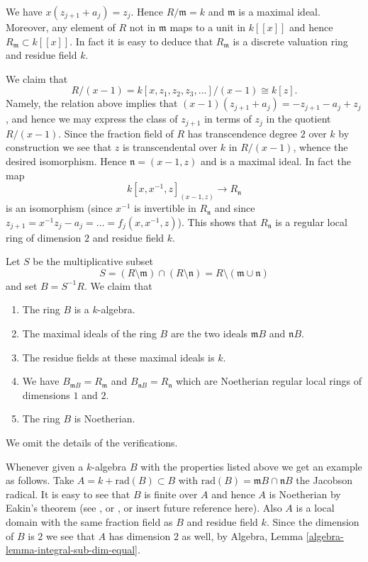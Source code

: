 \medskip\noindent
We have $x(z_{j + 1} + a_j) = z_j$. Hence $R/\mathfrak m = k$
and $\mathfrak m$ is a maximal ideal. Moreover, any element of $R$
not in $\mathfrak m$ maps to a unit in $k[[x]]$ and hence
$R_{\mathfrak m} \subset k[[x]]$. In fact it is easy to deduce
that $R_{\mathfrak m}$ is a discrete valuation ring and residue
field $k$.

\medskip\noindent
We claim that
$$
R/(x - 1) =
k[x, z_1, z_2, z_3, \ldots ]/(x - 1)
\cong
k[z].
$$
Namely, the relation above implies that
$(x - 1)(z_{j + 1} + a_j) = -z_{j + 1} - a_j + z_j$, and hence
we may express the class of $z_{j + 1}$ in terms of $z_j$ in
the quotient $R/(x - 1)$. Since the fraction field of $R$
has transcendence degree $2$ over $k$ by construction we see that $z$ is
transcendental over $k$ in $R/(x - 1)$, whence the desired isomorphism.
Hence $\mathfrak n = (x - 1, z)$ and is a maximal ideal. In fact the
map
$$
k[x, x^{-1}, z]_{(x - 1, z)} \longrightarrow R_{\mathfrak n}
$$
is an isomorphism (since $x^{-1}$ is invertible in $R_{\mathfrak n}$
and since $z_{j + 1} = x^{-1}z_j - a_j = \ldots = f_j(x, x^{-1}, z)$).
This shows that $R_{\mathfrak n}$ is a regular local ring
of dimension $2$ and residue field $k$.

\medskip\noindent
Let $S$ be the multiplicative subset
$$
S =
(R \setminus \mathfrak m) \cap (R \setminus \mathfrak n) =
R \setminus (\mathfrak m \cup \mathfrak n)
$$
and set $B = S^{-1}R$. We claim that
\begin{enumerate}
\item The ring $B$ is a $k$-algebra.
\item The maximal ideals of the ring $B$ are the two ideals
$\mathfrak mB$ and $\mathfrak nB$.
\item The residue fields at these maximal ideals is $k$.
\item We have $B_{\mathfrak mB} = R_{\mathfrak m}$
and $B_{\mathfrak nB} = R_{\mathfrak n}$
which are Noetherian regular local rings of dimensions $1$ and $2$.
\item The ring $B$ is Noetherian.
\end{enumerate}
We omit the details of the verifications.

\medskip\noindent
Whenever given a $k$-algebra $B$ with the properties listed above we
get an example as follows. Take $A = k + \text{rad}(B) \subset B$
with $\text{rad}(B) = \mathfrak mB \cap \mathfrak nB$ the Jacobson radical.
It is easy to see that $B$ is finite over $A$ and hence $A$ is
Noetherian by Eakin's theorem (see \cite{Eakin}, or
\cite[Appendix A1]{Nagata}, or insert future reference here).
Also $A$ is a local domain with the same fraction field as $B$ and
residue field $k$. Since the dimension of $B$ is $2$ we see that $A$
has dimension $2$ as well, by
Algebra, Lemma \ref{algebra-lemma-integral-sub-dim-equal}.

